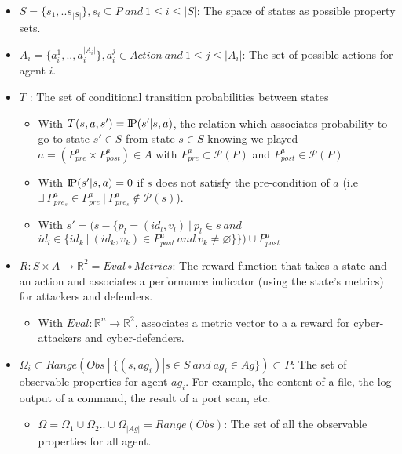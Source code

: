 \documentclass[conference]{IEEEtran}
\newcommand{\probP}{\text{I\kern-0.15em P}}
\begin{document}
\begin{itemize}
    \item $S = \{s_1, ..s_{|S|}\}, s_{i} \subseteq P \: and \: 1 \le i \le |S|$: The space of states as possible property sets.

    \item $A_{i} = \{a_{i}^{1},..,a_{i}^{|A_{i}|}\}, a_{i}^j \in Action \: and \: 1 \le j \le |A_i|$: The set of possible actions for agent $i$.

    \item $T$ : The set of conditional transition probabilities between states
    \begin{itemize}
        \item With $T(s,a,s') = \probP(s'|s,a)$, the relation which associates probability to go to state $s' \in S$ from state $s \in S$ knowing we played $a = (P^a_{pre} \times P^a_{post}) \in A$ with $P^a_{pre} \subset \mathcal{P}(P)$ and $P^a_{post} \in \mathcal{P}(P)$
        \item With $\probP(s'|s,a) = 0$ if $s$ does not satisfy the pre-condition of $a$ (i.e $\exists \: P_{pre_s}^{a} \in P_{pre}^{a} \: | \: P_{pre_s}^{a} \not\in \mathcal{P}(s)$).
        \item With $s' = (s - \{p_l=(id_l, v_l) \: | \: p_l \in s \: and$ $id_l \in \{id_k \: | \: (id_k, v_k) \in P^a_{post} \: and \: v_k \neq \varnothing\}\}) \cup P^a_{post}$
    \end{itemize}
    
    \item $R: S \times A \rightarrow \mathbb{R}^2 = Eval \circ Metrics$: The reward function that takes a state and an action and associates a performance indicator (using the state's metrics) for attackers and defenders.
    \begin{itemize}
        \item With $Eval: \mathbb{R}^{n} \rightarrow \mathbb{R}^2$, associates a metric vector to a a reward for cyber-attackers and cyber-defenders.
    \end{itemize}
    
    \item $\Omega_{i} \subset Range(Obs \: | \: \{ (s, ag_i) | s \in S \: and \: ag_i \in Ag \}) \subset P$: The set of observable properties for agent $ag_i$. For example, the content of a file, the log output of a command, the result of a port scan, etc.
    \begin{itemize}
        \item $\Omega = \Omega_1 \cup \Omega_2 .. \cup \Omega_{|Ag|} = Range(Obs)$: The set of all the observable properties for all agent.
    \end{itemize}


\end{itemize}
\end{document}
